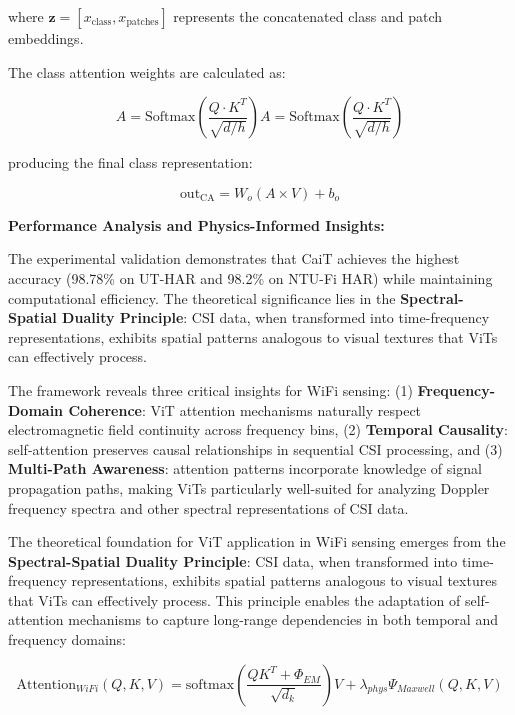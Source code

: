 \documentclass[journal]{IEEEtran}
\begin{document}
where $\mathbf{z} = [x_{\text{class}}, x_{\text{patches}}]$ represents the concatenated class and patch embeddings.

The class attention weights are calculated as:

\begin{equation}
A = \text{Softmax}\left(\frac{Q \cdot K^T}{\sqrt{d/h}}
\right)
A = \text{Softmax}\left(\frac{Q \cdot K^T}{\sqrt{d/h}}\right)
\label{eq:vit_cait_attention}
\end{equation}

producing the final class representation:

\begin{equation}
\text{out}_{\text{CA}} = W_o (A \times V) + b_o
\label{eq:vit_cait_output}
\end{equation}

\textbf{Performance Analysis and Physics-Informed Insights:}

The experimental validation demonstrates that CaiT achieves the highest accuracy (98.78\% on UT-HAR and 98.2\% on NTU-Fi HAR) while maintaining computational efficiency. The theoretical significance lies in the \textbf{Spectral-Spatial Duality Principle}: CSI data, when transformed into time-frequency representations, exhibits spatial patterns analogous to visual textures that ViTs can effectively process.

The framework reveals three critical insights for WiFi sensing: (1) \textbf{Frequency-Domain Coherence}: ViT attention mechanisms naturally respect electromagnetic field continuity across frequency bins, (2) \textbf{Temporal Causality}: self-attention preserves causal relationships in sequential CSI processing, and (3) \textbf{Multi-Path Awareness}: attention patterns incorporate knowledge of signal propagation paths, making ViTs particularly well-suited for analyzing Doppler frequency spectra and other spectral representations of CSI data.

The theoretical foundation for ViT application in WiFi sensing emerges from the \textbf{Spectral-Spatial Duality Principle}: CSI data, when transformed into time-frequency representations, exhibits spatial patterns analogous to visual textures that ViTs can effectively process. This principle enables the adaptation of self-attention mechanisms to capture long-range dependencies in both temporal and frequency domains:

\begin{equation}
\text{Attention}_{WiFi}(Q,K,V) = \text{softmax}\left(\frac{QK^T + \Phi_{EM}}{\sqrt{d_k}}
\right)V + \lambda_{phys} \Psi_{Maxwell}(Q,K,V)
\label{eq:vit_physics_attention}
\end{equation}
\end{document}
